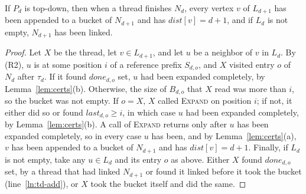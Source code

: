 \begin{lemma}
\label{lem:td-complete}
If $P_d$ is top-down, then when a thread finishes $N_d$, every vertex $v$ of $L_{d+1}$ has been appended to a bucket of $N_{d+1}$ and has $\mathit{dist}[v] = d+1$, and if $L_d$ is not empty, $N_{d+1}$ has been linked.
\end{lemma}
\begin{proof}
Let $X$ be the thread, let $v \in L_{d+1}$, and let $u$ be a neighbor of $v$ in $L_d$. By (R2), $u$ is at some position $i$ of a reference prefix $S_{d,o}$, and $X$ visited entry $o$ of $N_d$ after $\tau_d$. If it found $\mathit{done}_{d,o}$ set, $u$ had been expanded completely, by Lemma~\ref{lem:certs}(b). Otherwise, the size of $B_{d,o}$ that $X$ read was more than $i$, so the bucket was not empty. If $o = X$, $X$ called \textsc{Expand} on position $i$; if not, it either did so or found $\mathit{last}_{d,o} \geq i$, in which case $u$ had been expanded completely, by Lemma~\ref{lem:certs}(b). A call of \textsc{Expand} returns only after $u$ has been expanded completely, so in every case $u$ has been, and by Lemma~\ref{lem:certs}(a), $v$ has been appended to a bucket of $N_{d+1}$ and has $\mathit{dist}[v] = d+1$. Finally, if $L_d$ is not empty, take any $u \in L_d$ and its entry $o$ as above. Either $X$ found $\mathit{done}_{d,o}$ set, by a thread that had linked $N_{d+1}$ or found it linked before it took the bucket (line~\ref{ln:td-add}), or $X$ took the bucket itself and did the same.
\end{proof}

